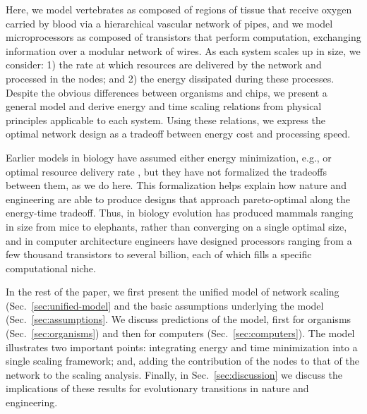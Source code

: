 \documentclass[12pt]{article}
\begin{document}
Here, we model vertebrates as composed of regions of tissue that receive oxygen
carried by blood via a hierarchical vascular network of pipes, and we model
microprocessors as composed of transistors that perform computation, exchanging
information over a modular network of wires.  As each system scales up in size,
we consider: 1) the rate at which resources are delivered by the network and
processed in the nodes; and 2) the energy dissipated during these processes.
Despite the obvious differences between organisms and chips, we present a
general model and derive energy and time scaling relations from physical
principles applicable to each system. Using these relations, we express the
optimal network design as a tradeoff between energy cost and processing speed. 


Earlier models in biology have assumed either energy minimization, e.g.,
\cite{west97} or optimal resource delivery rate \cite{banavar10}, but they have
not formalized the tradeoffs between them, as we do here.  This formalization
helps explain how  nature and engineering are able to produce designs that
approach pareto-optimal along the energy-time tradeoff.  Thus, in biology
evolution has produced mammals ranging in size from mice to elephants, rather
than converging on a single optimal size, and in computer architecture
engineers have designed processors ranging from a few thousand transistors to
several billion, each of which fills a specific computational niche.

In the rest of the paper, we first present the unified model of network scaling
(Sec.~\ref{sec:unified-model} and the basic assumptions underlying the model
(Sec.~\ref{sec:assumptions}.  We discuss predictions of the model, first for
organisms (Sec.~\ref{sec:organisms}) and then for computers
(Sec.~\ref{sec:computers}). The model illustrates two important points:  integrating energy and time minimization into a single scaling framework;  and, adding the contribution of the nodes to that of the network to the scaling analysis.  Finally, in
Sec.~\ref{sec:discussion}  we discuss the implications of these results for
evolutionary transitions in nature and engineering.
\end{document}
